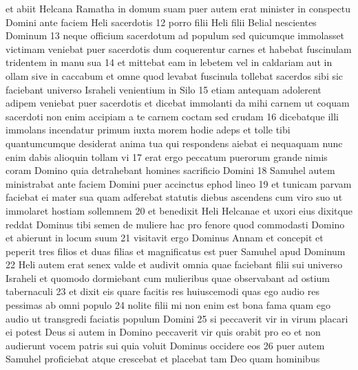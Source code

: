  et abiit Helcana Ramatha in domum suam puer autem erat minister in conspectu Domini ante faciem Heli sacerdotis  12 porro filii Heli filii Belial nescientes Dominum  13 neque officium sacerdotum ad populum sed quicumque immolasset victimam veniebat puer sacerdotis dum coquerentur carnes et habebat fuscinulam tridentem in manu sua  14 et mittebat eam in lebetem vel in caldariam aut in ollam sive in caccabum et omne quod levabat fuscinula tollebat sacerdos sibi sic faciebant universo Israheli venientium in Silo  15 etiam antequam adolerent adipem veniebat puer sacerdotis et dicebat immolanti da mihi carnem ut coquam sacerdoti non enim accipiam a te carnem coctam sed crudam  16 dicebatque illi immolans incendatur primum iuxta morem hodie adeps et tolle tibi quantumcumque desiderat anima tua qui respondens aiebat ei nequaquam nunc enim dabis alioquin tollam vi  17 erat ergo peccatum puerorum grande nimis coram Domino quia detrahebant homines sacrificio Domini  18 Samuhel autem ministrabat ante faciem Domini puer accinctus ephod lineo  19 et tunicam parvam faciebat ei mater sua quam adferebat statutis diebus ascendens cum viro suo ut immolaret hostiam sollemnem  20 et benedixit Heli Helcanae et uxori eius dixitque reddat Dominus tibi semen de muliere hac pro fenore quod commodasti Domino et abierunt in locum suum  21 visitavit ergo Dominus Annam et concepit et peperit tres filios et duas filias et magnificatus est puer Samuhel apud Dominum  22 Heli autem erat senex valde et audivit omnia quae faciebant filii sui universo Israheli et quomodo dormiebant cum mulieribus quae observabant ad ostium tabernaculi  23 et dixit eis quare facitis res huiuscemodi quas ego audio res pessimas ab omni populo  24 nolite filii mi non enim est bona fama quam ego audio ut transgredi faciatis populum Domini  25 si peccaverit vir in virum placari ei potest Deus si autem in Domino peccaverit vir quis orabit pro eo et non audierunt vocem patris sui quia voluit Dominus occidere eos  26 puer autem Samuhel proficiebat atque crescebat et placebat tam Deo quam hominibus\pend

